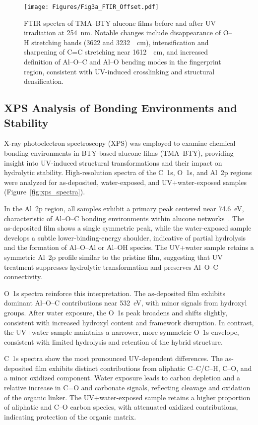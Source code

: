 \begin{figure}[ht]
  \centering
  \texttt{[image: Figures/Fig3a\_FTIR\_Offset.pdf]}
  \caption{FTIR spectra of TMA–BTY alucone films before and after UV irradiation at 254~nm. Notable changes include disappearance of O–H stretching bands (3622 and 3232~\si{\per\centi\meter}), intensification and sharpening of C=C stretching near 1612~\si{\per\centi\meter}, and increased definition of Al–O–C and Al–O bending modes in the fingerprint region, consistent with UV-induced crosslinking and structural densification.}
  \label{fig:ftir}
\end{figure}


\subsection{XPS Analysis of Bonding Environments and Stability}

X-ray photoelectron spectroscopy (XPS) was employed to examine chemical bonding environments in BTY-based alucone films (TMA–BTY), providing insight into UV-induced structural transformations and their impact on hydrolytic stability. High-resolution spectra of the C~1s, O~1s, and Al~2p regions were analyzed for as-deposited, water-exposed, and UV+water-exposed samples (Figure~\ref{fig:xps_spectra}).

In the Al~2p region, all samples exhibit a primary peak centered near 74.6~eV, characteristic of Al–O–C bonding environments within alucone networks~\cite{REF}. The as-deposited film shows a single symmetric peak, while the water-exposed sample develops a subtle lower-binding-energy shoulder, indicative of partial hydrolysis and the formation of Al–O–Al or Al–OH species. The UV+water sample retains a symmetric Al~2p profile similar to the pristine film, suggesting that UV treatment suppresses hydrolytic transformation and preserves Al–O–C connectivity.

O~1s spectra reinforce this interpretation. The as-deposited film exhibits dominant Al–O–C contributions near 532~eV, with minor signals from hydroxyl groups. After water exposure, the O~1s peak broadens and shifts slightly, consistent with increased hydroxyl content and framework disruption. In contrast, the UV+water sample maintains a narrower, more symmetric O~1s envelope, consistent with limited hydrolysis and retention of the hybrid structure.

C~1s spectra show the most pronounced UV-dependent differences. The as-deposited film exhibits distinct contributions from aliphatic C–C/C–H, C–O, and a minor oxidized component. Water exposure leads to carbon depletion and a relative increase in C=O and carbonate signals, reflecting cleavage and oxidation of the organic linker. The UV+water-exposed sample retains a higher proportion of aliphatic and C–O carbon species, with attenuated oxidized contributions, indicating protection of the organic matrix.


